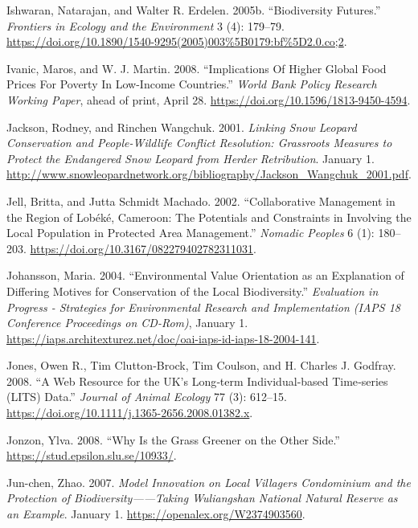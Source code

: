 \begin{CSLReferences}{1}{1}
Ishwaran, Natarajan, and Walter R. Erdelen. 2005b. {``Biodiversity
Futures.''} \emph{Frontiers in Ecology and the Environment} 3 (4):
179--79.
\url{https://doi.org/10.1890/1540-9295(2005)003\%5B0179:bf\%5D2.0.co;2}.

Ivanic, Maros, and W. J. Martin. 2008. {``Implications Of Higher Global
Food Prices For Poverty In Low-Income Countries.''} \emph{World Bank
Policy Research Working Paper}, ahead of print, April 28.
\url{https://doi.org/10.1596/1813-9450-4594}.

Jackson, Rodney, and Rinchen Wangchuk. 2001. \emph{Linking Snow Leopard
Conservation and People-Wildlife Conflict Resolution: Grassroots
Measures to Protect the Endangered Snow Leopard from Herder
Retribution}. January 1.
\url{http://www.snowleopardnetwork.org/bibliography/Jackson_Wangchuk_2001.pdf}.

Jell, Britta, and Jutta Schmidt Machado. 2002. {``Collaborative
Management in the Region of Lobéké, Cameroon: The Potentials and
Constraints in Involving the Local Population in Protected Area
Management.''} \emph{Nomadic Peoples} 6 (1): 180--203.
\url{https://doi.org/10.3167/082279402782311031}.

Johansson, Maria. 2004. {``Environmental Value Orientation as an
Explanation of Differing Motives for Conservation of the Local
Biodiversity.''} \emph{Evaluation in Progress - Strategies for
Environmental Research and Implementation (IAPS 18 Conference
Proceedings on CD-Rom)}, January 1.
\url{https://iaps.architexturez.net/doc/oai-iaps-id-iaps-18-2004-141}.

Jones, Owen R., Tim Clutton‐Brock, Tim Coulson, and H. Charles J.
Godfray. 2008. {``A Web Resource for the UK's Long‐term Individual‐based
Time‐series (LITS) Data.''} \emph{Journal of Animal Ecology} 77 (3):
612--15. \url{https://doi.org/10.1111/j.1365-2656.2008.01382.x}.

Jonzon, Ylva. 2008. {``Why Is the Grass Greener on the Other Side.''}
\url{https://stud.epsilon.slu.se/10933/}.

Jun-chen, Zhao. 2007. \emph{Model Innovation on Local Villagers
Condominium and the Protection of Biodiversity------Taking Wuliangshan
National Natural Reserve as an Example}. January 1.
\url{https://openalex.org/W2374903560}.


\end{CSLReferences}
